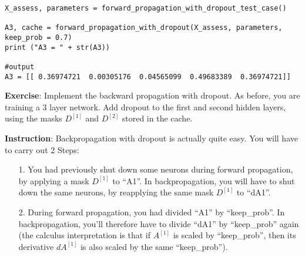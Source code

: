 \begin{verbatim}
X_assess, parameters = forward_propagation_with_dropout_test_case()

A3, cache = forward_propagation_with_dropout(X_assess, parameters, keep_prob = 0.7)
print ("A3 = " + str(A3))

#output
A3 = [[ 0.36974721  0.00305176  0.04565099  0.49683389  0.36974721]]
\end{verbatim}



\begin{tcolorbox}[title=Backward propagation with dropout]
{\textbf {Exercise}}: Implement the backward propagation with dropout. As before, you are training a 3 layer network. Add dropout to the first and second hidden layers, using the masks $D^{[1]}$ and $D^{[2]}$ stored in the cache. 

{\textbf {Instruction}}:
Backpropagation with dropout is actually quite easy. You will have to carry out 2 Steps:
\begin{itemize}
\item[1.] You had previously shut down some neurons during forward propagation, by applying a mask $D^{[1]}$ to ``A1''. In backpropagation, you will have to shut down the same neurons, by reapplying the same mask $D^{[1]}$ to ``dA1''. 
\item[2.] During forward propagation, you had divided ``A1'' by ``keep\_prob''. In backpropagation, you'll therefore have to divide ``dA1'' by ``keep\_prob'' again (the calculus interpretation is that if $A^{[1]}$ is scaled by ``keep\_prob'', then its derivative $dA^{[1]}$ is also scaled by the same ``keep\_prob'').
\end{itemize}
\end{tcolorbox}

